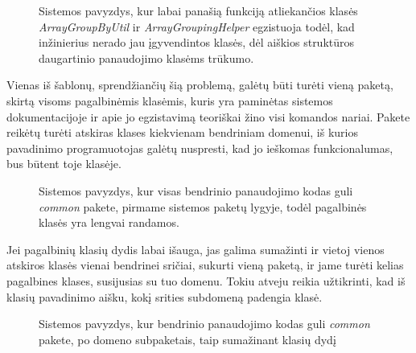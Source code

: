 \begin{figure}[H]
\snugshade
{}
\endsnugshade
\caption{Sistemos pavyzdys, kur labai panašią funkciją atliekančios klasės \textit{ArrayGroupByUtil} ir \textit{ArrayGroupingHelper}
egzistuoja todėl, kad inžinierius nerado jau įgyvendintos klasės, dėl aiškios struktūros daugartinio
panaudojimo klasėms trūkumo.}
\end{figure}
Vienas iš šablonų, sprendžiančių šią problemą, galėtų būti turėti vieną paketą, skirtą visoms pagalbinėmis klasėmis, kuris yra paminėtas sistemos
dokumentacijoje ir apie jo egzistavimą teoriškai žino visi komandos nariai.
Pakete reikėtų turėti atskiras klases kiekvienam bendriniam domenui, iš kurios pavadinimo programuotojas galėtų nuspresti,
kad jo ieškomas funkcionalumas, bus būtent toje klasėje.

\begin{figure}[H]
\snugshade
{}
\endsnugshade
\caption{Sistemos pavyzdys, kur visas bendrinio panaudojimo kodas guli \textit{common} pakete, pirmame sistemos paketų lygyje, todėl
pagalbinės klasės yra lengvai randamos.}
\end{figure}

Jei pagalbinių klasių dydis labai išauga, jas galima sumažinti ir vietoj vienos atskiros klasės vienai bendrinei sričiai, sukurti vieną paketą,
ir jame turėti kelias pagalbines klases, susijusias su tuo domenu.
Tokiu atveju reikia užtikrinti, kad iš klasių pavadinimo aišku, kokį srities subdomeną padengia klasė.

\begin{figure}[H]
\snugshade
{}
\endsnugshade
\caption{Sistemos pavyzdys, kur bendrinio panaudojimo kodas guli \textit{common} pakete, po domeno subpaketais, taip sumažinant klasių dydį }
\end{figure}

